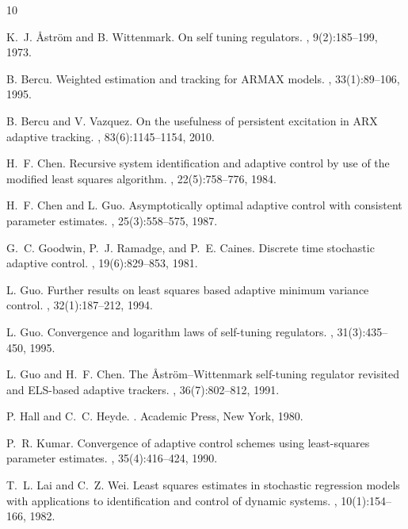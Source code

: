 \documentclass[11pt,reqno]{amsart}
\numberwithin{equation}{section}
\theoremstyle{definition}
\theoremstyle{remark}
\begin{document}
\begin{thebibliography}{10}

K.~J. {\AA}str{\"o}m and B. Wittenmark.
\newblock On self tuning regulators.
, 9(2):185--199, 1973.

B. Bercu.
\newblock Weighted estimation and tracking for {ARMAX} models.
, 33(1):89--106, 1995.

B. Bercu and V. Vazquez.
\newblock On the usefulness of persistent excitation in {ARX} adaptive
  tracking.
, 83(6):1145--1154, 2010.

H.~F. Chen.
\newblock Recursive system identification and adaptive control by use of the
  modified least squares algorithm.
, 22(5):758--776, 1984.

H.~F. Chen and L. Guo.
\newblock Asymptotically optimal adaptive control with consistent parameter
  estimates.
, 25(3):558--575, 1987.

G.~C. Goodwin, P.~J. Ramadge, and P.~E. Caines.
\newblock Discrete time stochastic adaptive control.
, 19(6):829--853, 1981.

L. Guo.
\newblock Further results on least squares based adaptive minimum variance
  control.
, 32(1):187--212, 1994.

L. Guo.
\newblock Convergence and logarithm laws of self-tuning regulators.
, 31(3):435--450, 1995.

L. Guo and H.~F. Chen.
\newblock The {{\AA}str{\"o}m--Wittenmark} self-tuning regulator revisited and
  {ELS}-based adaptive trackers.
, 36(7):802--812, 1991.

P. Hall and C.~C. Heyde.
.
\newblock Academic Press, New York, 1980.

P.~R. Kumar.
\newblock Convergence of adaptive control schemes using least-squares parameter
  estimates.
, 35(4):416--424, 1990.

T.~L. Lai and C.~Z. Wei.
\newblock Least squares estimates in stochastic regression models with
  applications to identification and control of dynamic systems.
, 10(1):154--166, 1982.


\end{thebibliography}
\end{document}
